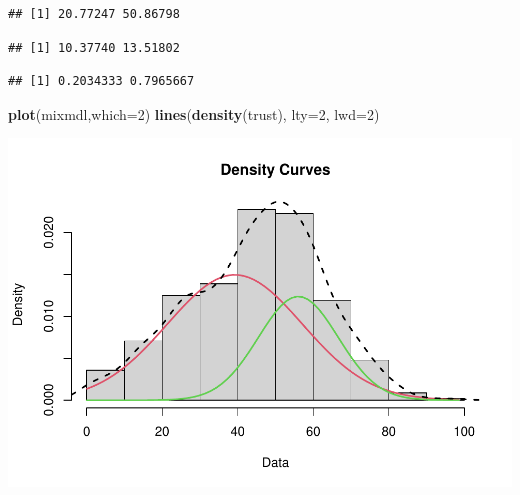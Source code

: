 \documentclass[
]{book}
\newenvironment{Shaded}{\begin{snugshade}}{\end{snugshade}}
\newcommand{\DataTypeTok}[1]{\textcolor[rgb]{0.13,0.29,0.53}{#1}}
\newcommand{\DecValTok}[1]{\textcolor[rgb]{0.00,0.00,0.81}{#1}}
\newcommand{\KeywordTok}[1]{\textcolor[rgb]{0.13,0.29,0.53}{\textbf{#1}}}
\newcommand{\NormalTok}[1]{#1}
\newcommand{\OperatorTok}[1]{\textcolor[rgb]{0.81,0.36,0.00}{\textbf{#1}}}
\begin{document}
\begin{verbatim}
## [1] 20.77247 50.86798
\end{verbatim}

\begin{Shaded}
\end{Shaded}

\begin{verbatim}
## [1] 10.37740 13.51802
\end{verbatim}

\begin{Shaded}
\end{Shaded}

\begin{verbatim}
## [1] 0.2034333 0.7965667
\end{verbatim}

\begin{Shaded}
\begin{Highlighting}[]
\KeywordTok{plot}\NormalTok{(mixmdl,}\DataTypeTok{which=}\DecValTok{2}\NormalTok{)}
\KeywordTok{lines}\NormalTok{(}\KeywordTok{density}\NormalTok{(trust), }\DataTypeTok{lty=}\DecValTok{2}\NormalTok{, }\DataTypeTok{lwd=}\DecValTok{2}\NormalTok{)}
\end{Highlighting}
\end{Shaded}

\includegraphics{bookdown-demo_files/figure-latex/307-2.pdf}
\end{document}
